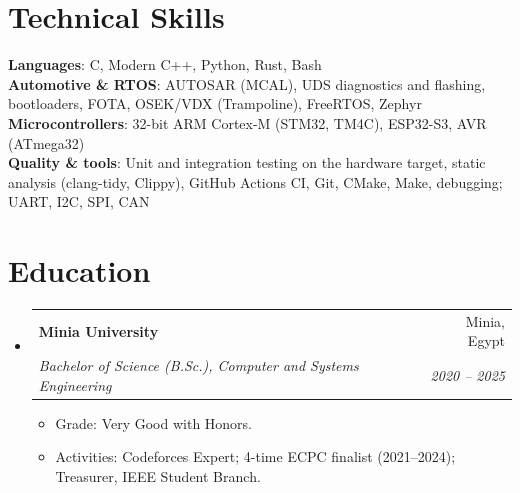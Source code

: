 \documentclass[letterpaper,11pt]{article}
\makeatletter
\newcommand{\resumeItem}[1]{
  \item\small{
    {#1 \vspace{-2pt}}
  }
}
\newcommand{\resumeSubheading}[4]{
  \vspace{-2pt}\item
    \begin{tabular*}{0.97\textwidth}[t]{l@{\extracolsep{\fill}}r}
      \textbf{#1} & #2 \\
      \textit{\small#3} & \textit{\small #4} \\
    \end{tabular*}\vspace{-7pt}
}
\newcommand{\resumeSubHeadingListStart}{\begin{itemize}[leftmargin=0.15in, label={}]}
\newcommand{\resumeSubHeadingListEnd}{\end{itemize}}
\newcommand{\resumeItemListStart}{\begin{itemize}}
\newcommand{\resumeItemListEnd}{\end{itemize}\vspace{-5pt}}
\makeatother
\begin{document}
%
\section{Technical Skills}
 \begin{itemize}[leftmargin=0.15in, label={}]
    \small{\item{
     \textbf{Languages}{: C, Modern C++, Python, Rust, Bash} \\
     \textbf{Automotive \& RTOS}{: AUTOSAR (MCAL), UDS diagnostics and flashing, bootloaders, FOTA, OSEK/VDX (Trampoline), FreeRTOS, Zephyr} \\
     \textbf{Microcontrollers}{: 32-bit ARM Cortex-M (STM32, TM4C), ESP32-S3, AVR (ATmega32)} \\
     \textbf{Quality \& tools}{: Unit and integration testing on the hardware target, static analysis (clang-tidy, Clippy), GitHub Actions CI, Git, CMake, Make, debugging; UART, I2C, SPI, CAN}
    }}
 \end{itemize}

\section{Education}
  \resumeSubHeadingListStart
    \resumeSubheading
      {Minia University}{Minia, Egypt}
      {Bachelor of Science (B.Sc.), Computer and Systems Engineering}{2020 -- 2025}
      \resumeItemListStart
        \resumeItem{Grade: Very Good with Honors.}
        \resumeItem{Activities: Codeforces Expert; 4-time ECPC finalist (2021--2024); Treasurer, IEEE Student Branch.}
      \resumeItemListEnd
  \resumeSubHeadingListEnd


\end{document}
